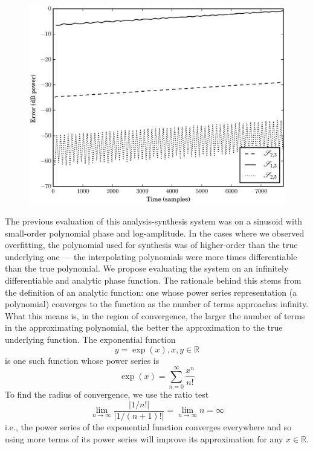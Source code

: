 \begin{figure}[!t]
    \centering
    \includegraphics[width=\figwidthscale\textwidth]{plots/mq_exp_err_comp_true_vs_est_err.eps}
\end{figure}
The previous evaluation of this analysis-synthesis system was on a sinusoid with
small-order polynomial phase and log-amplitude. In the cases where we observed overfitting, the
polynomial used for synthesis was of higher-order than the true underlying one
--- the interpolating polynomials were more times differentiable than the true
polynomial. We propose evaluating the system on an infinitely differentiable and
analytic phase function. The rationale behind this stems from the definition of
an analytic function: one whose power series representation (a polynomial)
converges to the function as the number of terms approaches infinity. What this
means is, in the region of convergence, the larger the number of terms in the
approximating polynomial, the better the approximation to the true underlying
function. The exponential function
\[
    y=\exp(x), x,y \in \mathbb{R}
\]
is one such function whose power series is
\[
    \exp(x)=\sum_{n=0}^{\infty} \frac{x^{n}}{n!}
\]
To find the radius of convergence, we use the ratio test
\[
    \lim_{n \rightarrow \infty} \frac{|1/n!|}{|1/(n+1)!|} = \lim_{n \rightarrow \infty} n = \infty
\]
i.e., the power series of the exponential function converges everywhere and so
using more terms of its power series will improve its approximation for
any $x \in \mathbb{R}$.

